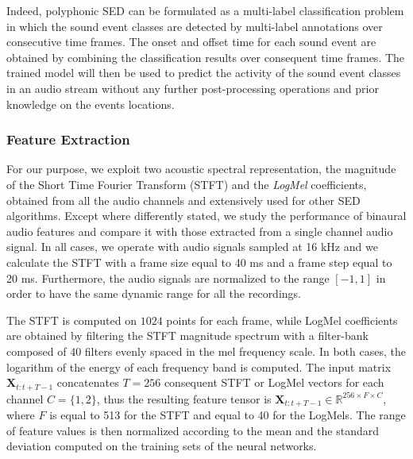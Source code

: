 Indeed, polyphonic SED can be formulated as a multi-label classification problem in which the sound event classes are detected by multi-label annotations over consecutive time frames. The onset and offset time for each sound event are obtained by combining the classification results over consequent time frames. The trained model will then be used to predict the activity of the sound event classes in an audio stream without any further post-processing operations and prior knowledge on the events locations.

\subsubsection{Feature Extraction}

For our purpose, we exploit two acoustic spectral representation, the magnitude of the Short Time Fourier Transform (STFT) and the \textit{LogMel} coefficients, obtained from all the audio channels and extensively used for other SED algorithms. Except where differently stated, we study the performance of binaural audio features and compare it with those extracted from a single channel audio signal. In all cases, we operate with audio signals sampled at 16 kHz and we calculate the STFT with a frame size equal to 40 ms and a frame step equal to 20 ms. Furthermore, the audio signals are normalized to the range $[-1, 1]$ in order to have the same dynamic range for all the recordings.

The STFT is computed on $1024$ points for each frame, while LogMel coefficients are obtained by filtering the STFT magnitude spectrum with a filter-bank composed of 40 filters evenly spaced in the mel frequency scale.
In both cases, the logarithm of the energy of each frequency band is computed. 
The input matrix $\mathbf{X}_{t:t+T-1}$ concatenates $T=256$ consequent STFT or LogMel vectors for each channel $C=\{1,2\}$, thus the resulting feature tensor is $\mathbf{X}_{t:t+T-1} \in \mathbb{R}^{256\times F \times C}$, where $F$ is equal to 513 for the STFT and equal to 40 for the LogMels.
The range of feature values is then normalized according to the mean and the standard deviation computed on the training sets of the neural networks.

